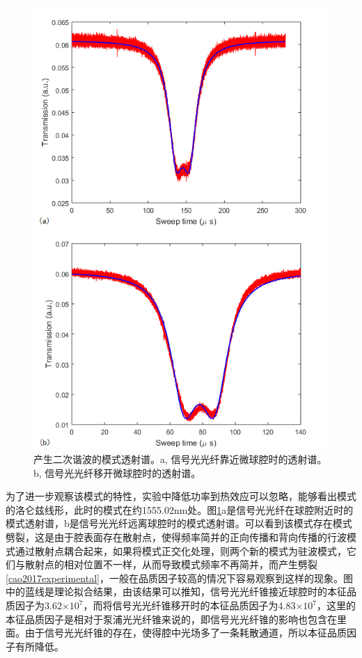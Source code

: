 \documentclass[UTF8,a4paper,cs4size,hyperref]{ctexart}
\begin{document}
\begin{figure}
\centering
\includegraphics[width=12cm ]{Qfit_w}
\caption{产生二次谐波的模式透射谱。a, 信号光光纤靠近微球腔时的透射谱。b, 信号光光纤移开微球腔时的透射谱。}
\label{pic:Qfit_w}
\end{figure}

为了进一步观察该模式的特性，实验中降低功率到热效应可以忽略，能够看出模式的洛仑兹线形，此时的模式在约1555.02nm处。图\ref{pic:Qfit_w}a是信号光光纤在球腔附近时的模式透射谱，b是信号光光纤远离球腔时的模式透射谱。可以看到该模式存在模式劈裂，这是由于腔表面存在散射点，使得频率简并的正向传播和背向传播的行波模式通过散射点耦合起来，如果将模式正交化处理，则两个新的模式为驻波模式，它们与散射点的相对位置不一样，从而导致模式频率不再简并，而产生劈裂\ref{cao2017experimental}，一般在品质因子较高的情况下容易观察到这样的现象。图中的蓝线是理论拟合结果，由该结果可以推知，信号光光纤锥接近球腔时的本征品质因子为3.62$\times 10^7$，而将信号光光纤锥移开时的本征品质因子为4.83$\times 10^7$，这里的本征品质因子是相对于泵浦光光纤锥来说的，即信号光光纤锥的影响也包含在里面。由于信号光光纤锥的存在，使得腔中光场多了一条耗散通道，所以本征品质因子有所降低。
\end{document}
